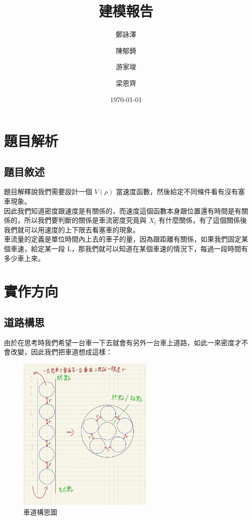 \documentclass[a4paper, 11pt]{report}
\title{\textbf{建模報告}}
\author{鄭詠澤\and 陳郁錡\and 游家竣\and 梁恩齊}
\date{\today}
\begin{document}
\maketitle
\tableofcontents
\chapter{題目解析}

\section{題目敘述}

題目解釋說我們需要設計一個 $V(\rho)$ 當速度函數，然後給定不同條件看有沒有塞車現象。\\

因此我們知道密度跟速度是有關係的，而速度這個函數本身跟位置還有時間是有關係的，所以我們要判斷的關係是車流密度究竟與 $X_t$ 有什麼關係，有了這個關係後我們就可以用速度的上下限去看塞車的現象。\\

車流量的定義是單位時間內上去的車子的量，因為跟距離有關係，如果我們固定某個車速，給定某一段 L，那我們就可以知道在某個車速的情況下，每過一段時間有多少車上來。 

\chapter{實作方向}

\section{道路構思}

由於在思考時我們希望一台車一下去就會有另外一台車上道路，如此一來密度才不會改變，因此我們把車道想成這樣：

\begin{figure}[h] 
\centering 
\includegraphics[width=0.6\textwidth]{11-2} 
\caption{車道構思圖} 
\label{Fig.main2} 
\end{figure}
\end{document}
